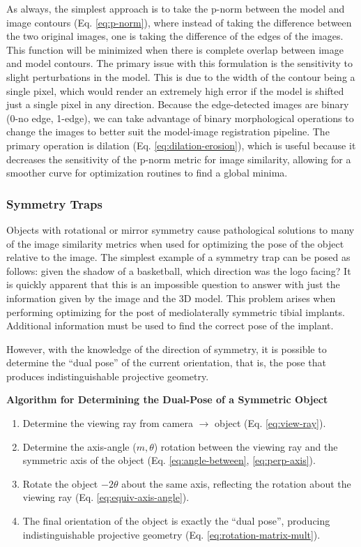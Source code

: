 As always, the simplest approach is to take the p-norm between the model and image contours (Eq. \ref{eq:p-norm}), where instead of taking the difference between the two original images, one is taking the difference of the edges of the images. This function will be minimized when there is complete overlap between image and model contours. The primary issue with this formulation is the sensitivity to slight perturbations in the model. This is due to the width of the contour being a single pixel, which would render an extremely high error if the model is shifted just a single pixel in any direction. Because the edge-detected images are binary (0-no edge, 1-edge), we can take advantage of binary morphological operations to change the images to better suit the model-image registration pipeline. The primary operation is dilation (Eq. \ref{eq:dilation-erosion}), which is useful because it decreases the sensitivity of the p-norm metric for image similarity, allowing for a smoother curve for optimization routines to find a global minima.

\subsubsection{Symmetry Traps}
Objects with rotational or mirror symmetry cause pathological solutions to many of the image similarity metrics when used for optimizing the pose of the object relative to the image. The simplest example of a symmetry trap can be posed as follows: given the shadow of a basketball, which direction was the logo facing? It is quickly apparent that this is an impossible question to answer with just the information given by the image and the 3D model. This problem arises when performing optimizing for the post of mediolaterally symmetric tibial implants. Additional information must be used to find the correct pose of the implant.

However, with the knowledge of the direction of symmetry, it is possible to determine the ``dual pose'' of the current orientation, that is, the pose that produces indistinguishable projective geometry.

\begin{mdframed}
    \begin{center}
        {\bf Algorithm for Determining the Dual-Pose of a Symmetric Object}
    \end{center}
\begin{enumerate}
    \item Determine the viewing ray from camera $\rightarrow$ object (Eq. \ref{eq:view-ray}).
    \item Determine the axis-angle ($m,\theta$) rotation between the viewing ray and the symmetric axis of the object (Eq. \ref{eq:angle-between}, \ref{eq:perp-axis}).
    \item Rotate the object $-2\theta$ about the same axis, reflecting the rotation about the viewing ray (Eq. \ref{eq:equiv-axis-angle}).
    \item The final orientation of the object is exactly the ``dual pose'', producing indistinguishable projective geometry (Eq. \ref{eq:rotation-matrix-mult}).
\end{enumerate}
\end{mdframed}

